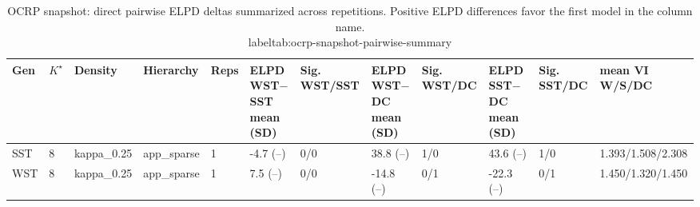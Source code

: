 \begin{table}[!h]
\centering
\caption{OCRP snapshot: direct pairwise ELPD deltas summarized across repetitions. Positive ELPD differences favor the first model in the column name.\\label{tab:ocrp-snapshot-pairwise-summary}}
\centering
\begin{tabular}[t]{llllllllllll}
\toprule
Gen & $K^\star$ & Density & Hierarchy & Reps & ELPD WST$-$SST mean (SD) & Sig. WST/SST & ELPD WST$-$DC mean (SD) & Sig. WST/DC & ELPD SST$-$DC mean (SD) & Sig. SST/DC & mean VI W/S/DC\\
\midrule
SST & 8 & kappa_0.25 & app_sparse & 1 & -4.7 (--) & 0/0 & 38.8 (--) & 1/0 & 43.6 (--) & 1/0 & 1.393/1.508/2.308\\
WST & 8 & kappa_0.25 & app_sparse & 1 & 7.5 (--) & 0/0 & -14.8 (--) & 0/1 & -22.3 (--) & 0/1 & 1.450/1.320/1.450\\
\bottomrule
\end{tabular}
\end{table}
